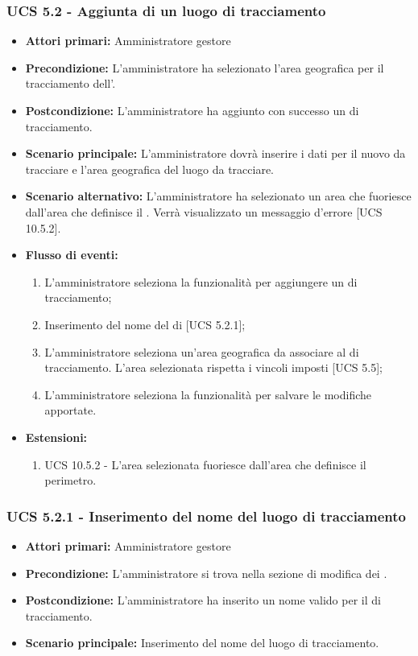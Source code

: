 \subsubsection{UCS 5.2 - Aggiunta di un luogo di tracciamento}%
\begin{itemize}
    \item \textbf{Attori primari:} Amministratore gestore
    \item \textbf{Precondizione:} L'amministratore ha selezionato l’area geografica per il tracciamento dell'.
    \item \textbf{Postcondizione:} L'amministratore ha aggiunto con successo un  di tracciamento.
    \item \textbf{Scenario principale:} L'amministratore dovrà inserire i dati per il nuovo  da tracciare e l'area geografica del luogo da tracciare.
    \item \textbf{Scenario alternativo:} L'amministratore ha selezionato un area che fuoriesce dall'area che definisce il . Verrà visualizzato un messaggio d'errore [UCS 10.5.2].
    \item \textbf{Flusso di eventi:}
    \begin{enumerate}     
        \item L'amministratore seleziona la funzionalità per aggiungere un  di tracciamento;
        \item Inserimento del nome del  di  [UCS 5.2.1];
        \item L'amministratore seleziona un'area geografica da associare al  di tracciamento. L'area selezionata rispetta i vincoli imposti [UCS 5.5]; 
        \item L'amministratore seleziona la funzionalità per salvare le modifiche apportate.
    \end{enumerate}   
    \item \textbf{Estensioni:}
    \begin{enumerate}
        \item UCS 10.5.2 - L'area selezionata fuoriesce dall'area che definisce il perimetro.
    \end{enumerate}
\end{itemize}

\subsubsection{UCS 5.2.1 - Inserimento del nome del luogo di tracciamento}%
\begin{itemize}
    \item \textbf{Attori primari:} Amministratore gestore
    \item \textbf{Precondizione:} L'amministratore si trova nella sezione di modifica dei .
    \item \textbf{Postcondizione:} L'amministratore ha inserito un nome valido per il  di tracciamento.
    \item \textbf{Scenario principale:} Inserimento del nome del luogo di tracciamento.
\end{itemize}

